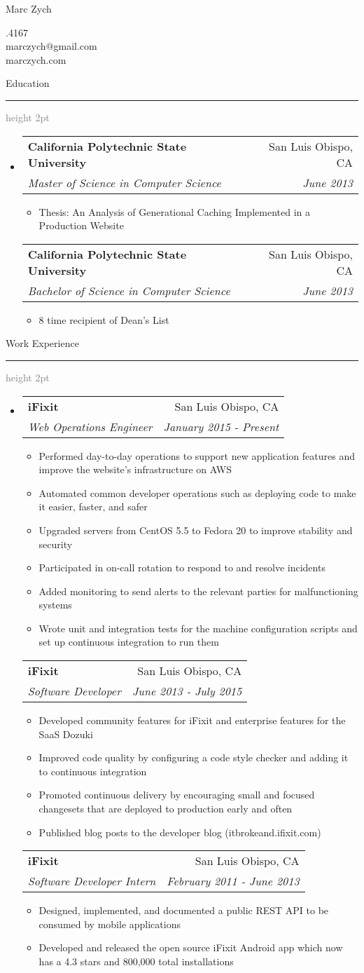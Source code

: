 \documentclass[letterpaper,11pt]{article}
\makeatletter
\newcommand{\resauthor}[4]{
   \begin{minipage}[c]{.4\textwidth}
      \raggedright
      {\Huge #1}
   \end{minipage}
   \hfill
   \begin{minipage}[c]{.4\textwidth}
      \raggedleft
      #2\\
      #3\\
      #4
   \end{minipage}
}
\newcommand{\ressectiondivider}{
   \vspace{5pt}
   \textcolor{gray}{\hrule height 2pt}
}
\newcommand{\resitem}[1]{\item #1 \vspace{-2pt}}
\newcommand{\resheading}[1]{
   {\Large #1}
   \ressectiondivider
}
\newcommand{\ressubheading}[4]{
   \begin{tabular*}{7.0in}{l@{\extracolsep{\fill}}r}
         \textbf{#1} & #2 \\
         \textit{#3} & \textit{#4} \\
   \end{tabular*}\vspace{-6pt}
}
\makeatother
\begin{document}
\resauthor{Marc Zych}{805.217.4167}{marczych@gmail.com}{marczych.com}

\vspace{20pt}

\resheading{Education}
\begin{itemize}
\item
   \ressubheading{California Polytechnic State University}{San Luis Obispo, CA}{Master of Science in Computer Science}{June 2013}
   \begin{itemize}
      \resitem{Thesis: An Analysis of Generational Caching Implemented in a Production Website}
   \end{itemize}
   \ressubheading{California Polytechnic State University}{San Luis Obispo, CA}{Bachelor of Science in Computer Science}{June 2013}
   \begin{itemize}
      \resitem{8 time recipient of Dean's List}
   \end{itemize}
\end{itemize}

\resheading{Work Experience}
\begin{itemize}
\item
   \ressubheading{iFixit}{San Luis Obispo, CA}{Web Operations Engineer}{January 2015 - Present}
   \begin{itemize}
      \resitem{Performed day-to-day operations to support new application features and improve the website's infrastructure on AWS}
      \resitem{Automated common developer operations such as deploying code to make it easier, faster, and safer}
      \resitem{Upgraded servers from CentOS 5.5 to Fedora 20 to improve stability and security}
      \resitem{Participated in on-call rotation to respond to and resolve incidents}
      \resitem{Added monitoring to send alerts to the relevant parties for malfunctioning systems}
      \resitem{Wrote unit and integration tests for the machine configuration scripts and set up continuous integration to run them}
   \end{itemize}
   \ressubheading{iFixit}{San Luis Obispo, CA}{Software Developer}{June 2013 - July 2015}
   \begin{itemize}
      \resitem{Developed community features for iFixit and enterprise features for the SaaS Dozuki}
      \resitem{Improved code quality by configuring a code style checker and adding it to continuous integration}
      \resitem{Promoted continuous delivery by encouraging small and focused changesets that are deployed to production early and often}
      \resitem{Published blog posts to the developer blog (itbrokeand.ifixit.com)}
   \end{itemize}
   \ressubheading{iFixit}{San Luis Obispo, CA}{Software Developer Intern}{February 2011 - June 2013}
   \begin{itemize}
      \resitem{Designed, implemented, and documented a public REST API to be consumed by mobile applications}
      \resitem{Developed and released the open source iFixit Android app which now has a 4.3 stars and 800,000 total installations}
   \end{itemize}
\end{itemize}
\end{document}
